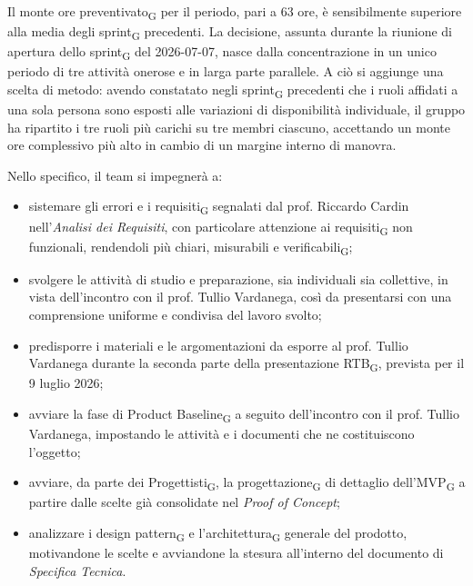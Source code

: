 ﻿\documentclass[a4paper, 10pt, colorlinks=true, linkcolor=black, urlcolor=blue, citecolor=blue, hidelinks]{article}
\begin{document}
Il monte ore preventivato\textsubscript{G} per il periodo, pari a 63 ore, è sensibilmente superiore alla media degli sprint\textsubscript{G} precedenti. La decisione, assunta durante la riunione di apertura dello sprint\textsubscript{G} del 2026-07-07, nasce dalla concentrazione in un unico periodo di tre attività onerose e in larga parte parallele. A ciò si aggiunge una scelta di metodo: avendo constatato negli sprint\textsubscript{G} precedenti che i ruoli affidati a una sola persona sono esposti alle variazioni di disponibilità individuale, il gruppo ha ripartito i tre ruoli più carichi su tre membri ciascuno, accettando un monte ore complessivo più alto in cambio di un margine interno di manovra.

Nello specifico, il team si impegnerà a:
\begin{itemize}
    \item sistemare gli errori e i requisiti\textsubscript{G} segnalati dal prof. Riccardo Cardin nell'\textit{Analisi dei Requisiti}, con particolare attenzione ai requisiti\textsubscript{G} non funzionali, rendendoli più chiari, misurabili e verificabili\textsubscript{G};

    \item svolgere le attività di studio e preparazione, sia individuali sia collettive, in vista dell'incontro con il prof. Tullio Vardanega, così da presentarsi con una comprensione uniforme e condivisa del lavoro svolto;

    \item predisporre i materiali e le argomentazioni da esporre al prof. Tullio Vardanega durante la seconda parte della presentazione RTB\textsubscript{G}, prevista per il 9 luglio 2026;

    \item avviare la fase di Product Baseline\textsubscript{G} a seguito dell'incontro con il prof. Tullio Vardanega, impostando le attività e i documenti che ne costituiscono l'oggetto;

    \item avviare, da parte dei Progettisti\textsubscript{G}, la progettazione\textsubscript{G} di dettaglio dell'MVP\textsubscript{G} a partire dalle scelte già consolidate nel \textit{Proof of Concept};

    \item analizzare i design pattern\textsubscript{G} e l'architettura\textsubscript{G} generale del prodotto, motivandone le scelte e avviandone la stesura all'interno del documento di \textit{Specifica Tecnica}.
\end{itemize}
\end{document}
